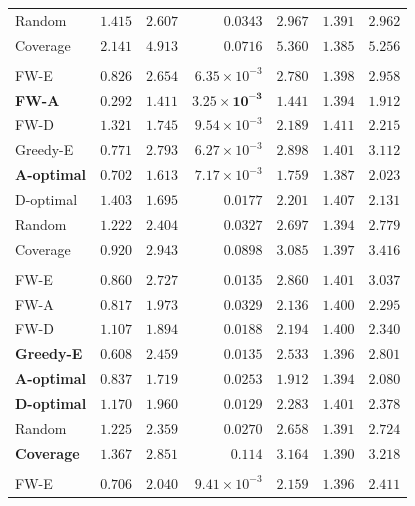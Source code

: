 \documentclass[letterpaper, 9
 pt, conference]{ieeeconf}
\begin{document}
\begin{table}[ht]
\begin{tabular}{lrrrrrr}
Random & $1.415$ & $2.607$ & $0.0343$ & $2.967$ & $1.391$ & $2.962$ \\
Coverage & $2.141$ & $4.913$ & $0.0716$ & $5.360$ & $1.385$ & $5.256$ \\
\addlinespace[1pt]
\multicolumn{7}{l}{\textit{$K{=}30$}} \\[1pt]
FW-E & $0.826$ & $2.654$ & $6.35\!\times\!10^{-3}$ & $2.780$ & $1.398$ & $2.958$ \\
\textbf{FW-A} & $\mathbf{0.292}$ & $\mathbf{1.411}$ & $\mathbf{3.25\!\times\!10^{-3}}$ & $\mathbf{1.441}$ & $1.394$ & $\mathbf{1.912}$ \\
FW-D & $1.321$ & $1.745$ & $9.54\!\times\!10^{-3}$ & $2.189$ & $1.411$ & $2.215$ \\
Greedy-E & $0.771$ & $2.793$ & $6.27\!\times\!10^{-3}$ & $2.898$ & $1.401$ & $3.112$ \\
\textbf{A-optimal} & $0.702$ & $1.613$ & $7.17\!\times\!10^{-3}$ & $1.759$ & $\mathbf{1.387}$ & $2.023$ \\
D-optimal & $1.403$ & $1.695$ & $0.0177$ & $2.201$ & $1.407$ & $2.131$ \\
Random & $1.222$ & $2.404$ & $0.0327$ & $2.697$ & $1.394$ & $2.779$ \\
Coverage & $0.920$ & $2.943$ & $0.0898$ & $3.085$ & $1.397$ & $3.416$ \\
\addlinespace[1pt]
\multicolumn{7}{l}{\textit{$K{=}40$}} \\[1pt]
FW-E & $0.860$ & $2.727$ & $0.0135$ & $2.860$ & $1.401$ & $3.037$ \\
FW-A & $0.817$ & $1.973$ & $0.0329$ & $2.136$ & $1.400$ & $2.295$ \\
FW-D & $1.107$ & $1.894$ & $0.0188$ & $2.194$ & $1.400$ & $2.340$ \\
\textbf{Greedy-E} & $\mathbf{0.608}$ & $2.459$ & $0.0135$ & $2.533$ & $1.396$ & $2.801$ \\
\textbf{A-optimal} & $0.837$ & $\mathbf{1.719}$ & $0.0253$ & $\mathbf{1.912}$ & $1.394$ & $\mathbf{2.080}$ \\
\textbf{D-optimal} & $1.170$ & $1.960$ & $\mathbf{0.0129}$ & $2.283$ & $1.401$ & $2.378$ \\
Random & $1.225$ & $2.359$ & $0.0270$ & $2.658$ & $1.391$ & $2.724$ \\
\textbf{Coverage} & $1.367$ & $2.851$ & $0.114$ & $3.164$ & $\mathbf{1.390}$ & $3.218$ \\
\addlinespace[1pt]
\multicolumn{7}{l}{\textit{$K{=}50$}} \\[1pt]
FW-E & $0.706$ & $2.040$ & $9.41\!\times\!10^{-3}$ & $2.159$ & $1.396$ & $2.411$ \\

\end{tabular}
\end{table}
\end{document}
